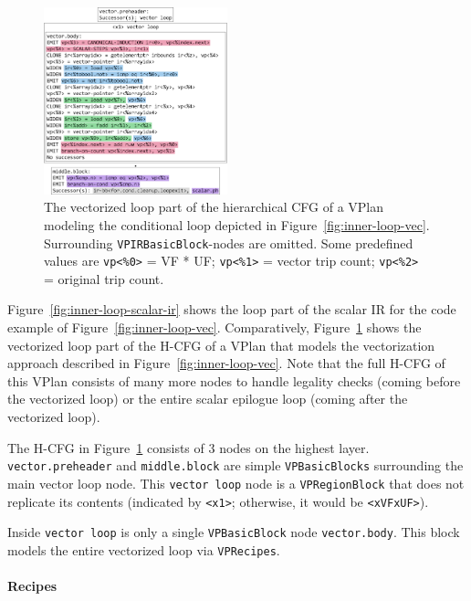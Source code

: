 \documentclass[sigplan,11pt,nonacm]{acmart}
\begin{document}
\begin{figure}
  \centering
  \includegraphics[width=0.475\textwidth]{images/inner-loop-vplan-hcfg-loop-body-color.png}
  \caption{The vectorized loop part of the hierarchical CFG of a VPlan modeling the 
  conditional loop depicted in Figure~\ref{fig:inner-loop-vec}. 
  Surrounding \texttt{VPIRBasicBlock}-nodes are omitted.
  Some predefined values are
  \texttt{vp<\%0>} = VF * UF; \texttt{vp<\%1>} = vector trip count; \texttt{vp<\%2>} = original trip count.}
  \label{fig:inner-loop-vplan-hcfg-body}
\end{figure}

Figure~\ref{fig:inner-loop-scalar-ir} shows the loop part of the scalar IR for the code example
of Figure~\ref{fig:inner-loop-vec}. Comparatively, Figure~\ref{fig:inner-loop-vplan-hcfg-body}
shows the vectorized loop part of the H-CFG of a VPlan that models the vectorization approach described
in Figure~\ref{fig:inner-loop-vec}. Note that the full H-CFG of this VPlan consists of many more nodes 
to handle legality checks (coming before the vectorized loop) or the entire scalar epilogue loop 
(coming after the vectorized loop).

The H-CFG in Figure~\ref{fig:inner-loop-vplan-hcfg-body} consists of 3 nodes on the highest layer. 
\texttt{vector.preheader} and \texttt{middle.block} 
are simple \texttt{VPBasicBlocks} surrounding the main vector loop node. This \texttt{vector loop} node 
is a \texttt{VPRegionBlock} that does 
not replicate its contents (indicated by \texttt{<x1>}; otherwise, it would be \texttt{<xVFxUF>}).

Inside \texttt{vector loop} is only a single \texttt{VPBasicBlock} node \texttt{vector.body}. This block 
models the entire vectorized loop via \texttt{VPRecipes}.

\paragraph{Recipes}
\end{document}
